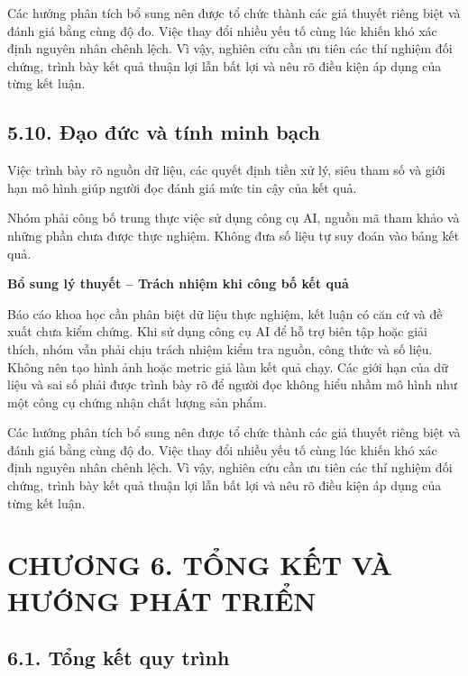 \documentclass[12pt,a4paper,oneside]{article}
\begin{document}
Các hướng phân tích bổ sung nên được tổ chức thành các giả thuyết riêng biệt và đánh giá bằng cùng độ đo. Việc thay đổi nhiều yếu tố cùng lúc khiến khó xác định nguyên nhân chênh lệch. Vì vậy, nghiên cứu cần ưu tiên các thí nghiệm đối chứng, trình bày kết quả thuận lợi lẫn bất lợi và nêu rõ điều kiện áp dụng của từng kết luận.\par

\subsection*{5.10. Đạo đức và tính minh bạch}

Việc trình bày rõ nguồn dữ liệu, các quyết định tiền xử lý, siêu tham số
và giới hạn mô hình giúp người đọc đánh giá mức tin cậy của kết quả.

Nhóm phải công bố trung thực việc sử dụng công cụ AI, nguồn mã tham khảo
và những phần chưa được thực nghiệm. Không đưa số liệu tự suy đoán vào
bảng kết quả.


\par\noindent\textbf{Bổ sung lý thuyết -- Trách nhiệm khi công bố kết quả}\par
Báo cáo khoa học cần phân biệt dữ liệu thực nghiệm, kết luận có căn cứ và đề xuất chưa kiểm chứng. Khi sử dụng công cụ AI để hỗ trợ biên tập hoặc giải thích, nhóm vẫn phải chịu trách nhiệm kiểm tra nguồn, công thức và số liệu. Không nên tạo hình ảnh hoặc metric giả làm kết quả chạy. Các giới hạn của dữ liệu và sai số phải được trình bày rõ để người đọc không hiểu nhầm mô hình như một công cụ chứng nhận chất lượng sản phẩm.\par

Các hướng phân tích bổ sung nên được tổ chức thành các giả thuyết riêng biệt và đánh giá bằng cùng độ đo. Việc thay đổi nhiều yếu tố cùng lúc khiến khó xác định nguyên nhân chênh lệch. Vì vậy, nghiên cứu cần ưu tiên các thí nghiệm đối chứng, trình bày kết quả thuận lợi lẫn bất lợi và nêu rõ điều kiện áp dụng của từng kết luận.\par

\clearpage
\section*{CHƯƠNG 6. TỔNG KẾT VÀ HƯỚNG PHÁT TRIỂN}

\subsection*{6.1. Tổng kết quy trình}
\end{document}
